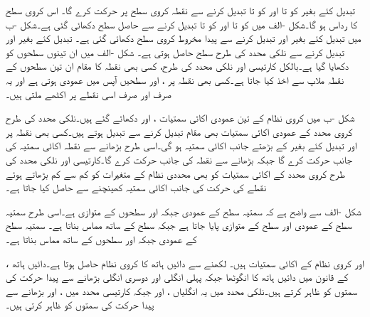  تبدیل کئے بغیر  کو  تا  اور  کو  تا  تبدیل کرنے سے  نقطہ  کروی  سطح  پر حرکت کرے گا۔ اس کروی سطح کا رداس  ہو گا۔شکل -الف  میں  کو  تا  اور  کو  تا  تبدیل کرنے سے حاصل سطح  دکھائی گئی ہے۔شکل -ب میں  تبدیل کئے بغیر  اور  تبدیل کرنے سے پیدا مخروط    کروی سطح دکھائی گئی ہے۔ تبدیل کئے بغیر  اور  تبدیل کرنے سے  نلکی محدد کی طرح  سطح حاصل ہوتی ہے۔ شکل -الف میں ان تینوں سطحوں کو دکھایا گیا ہے۔بالکل کارتیسی اور نلکی محدد کی طرح، کسی بھی نقطہ  کا مقام ان تین سطحوں کے نقطہ ملاپ سے اخذ کیا جاتا ہے۔کسی بھی نقطہ  پر ،  اور  سطحیں آپس میں عمودی ہوتی ہے اور یہ صرف اور صرف اسی نقطے پر اکٹھے ملتی ہیں۔

شکل -ب میں کروی نظام کے تین عمودی اکائی سمتیات ،  اور  دکھائے گئے ہیں۔نلکی محدد کی طرح کروی محدد کے عمودی اکائی سمتیات بھی مقام تبدیل کرنے سے تبدیل ہوتے ہیں۔کسی بھی نقطہ  پر  اور  تبدیل کئے بغیر  کے بڑھتے جانب اکائی سمتیہ  ہو گی۔اسی طرح  بڑھانے سے نقطہ  اکائی سمتیہ  کی جانب حرکت کرے گا جبکہ  بڑھانے سے نقطہ  کی جانب حرکت کرے گا۔کارتیسی اور نلکی محدد کی طرح کروی محدد کے اکائی سمتیات کو بھی محددی نظام کے متغیرات کو کم سے کم بڑھاتے ہوئے  نقطے کی حرکت کی جانب اکائی سمتیہ کھینچنے سے حاصل کیا جاتا ہے۔

شکل -الف سے واضح ہے کہ  سمتیہ  سطح کے عمودی جبکہ  اور  سطحوں کے متوازی ہے۔اسی طرح  سمتیہ  سطح کے عمودی اور  سطح کے متوازی پایا جاتا ہے جبکہ  سطح کے ساتھ مماس بناتا ہے۔ سمتیہ  سطح کے عمودی جبکہ  اور  سطحوں کے ساتھ مماس بناتا ہے۔

 
،  اور  کروی نظام  کے اکائی سمتیات ہیں۔ لکھنے سے  دائیں ہاتھ کا کروی نظام حاصل ہوتا ہے۔دائیں ہاتھ کے قانون میں دائیں ہاتھ کا انگوٹھا   جبکہ پہلی انگلی   اور دوسری انگلی  بڑھانے سے پیدا حرکت کی سمتوں کو ظاہر کرتے ہیں۔نلکی محدد میں یہ انگلیاں ،  اور  جبکہ کارتیسی محدد میں ،  اور  بڑھانے سے پیدا حرکت کی سمتوں کو ظاہر کرتی ہیں۔

